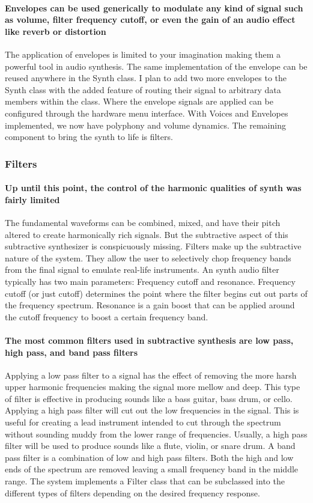 \documentclass[acmlarge,screen]{acmart}
\begin{document}
	
	\paragraph{Envelopes can be used generically to modulate any kind of signal such as volume, filter frequency cutoff, or even the gain of an audio effect like reverb or distortion} The application of envelopes is limited to your imagination making them a powerful tool in audio synthesis. The same implementation of the envelope can be reused anywhere in the Synth class. I plan to add two more envelopes to the Synth class with the added feature of routing their signal to arbitrary data members within the class. Where the envelope signals are applied can be configured through the hardware menu interface. With Voices and Envelopes implemented, we now have polyphony and volume dynamics. The remaining component to bring the synth to life is filters.

	\subsubsection{Filters}
	\paragraph{Up until this point, the control of the harmonic qualities of synth was fairly limited} The fundamental waveforms can be combined, mixed, and have their pitch altered to create harmonically rich signals. But the subtractive aspect of this subtractive synthesizer is conspicuously missing. Filters make up the subtractive nature of the system. They allow the user to selectively chop frequency bands from the final signal to emulate real-life instruments.\cite{welsh_2006} An synth audio filter typically has two main parameters: Frequency cutoff and resonance. Frequency cutoff (or just cutoff) determines the point where the filter begins cut out parts of the frequency spectrum. Resonance is a gain boost that can be applied around the cutoff frequency to boost a certain frequency band. \cite{musictech}
	
	\paragraph{The most common filters used in subtractive synthesis are low pass, high pass, and band pass filters} Applying a low pass filter to a signal has the effect of removing the more harsh upper harmonic frequencies making the signal more mellow and deep. This type of filter is effective in producing sounds like a bass guitar, bass drum, or cello. Applying a high pass filter will cut out the low frequencies in the signal. This is useful for creating a lead instrument intended to cut through the spectrum without sounding muddy from the lower range of frequencies. Usually, a high pass filter will be used to produce sounds like a flute, violin, or snare drum. A band pass filter is a combination of low and high pass filters. Both the high and low ends of the spectrum are removed leaving a small frequency band in the middle range. The system implements a Filter class that can be subclassed into the different types of filters depending on the desired frequency response. \cite{hass_2021} 
	
\end{document}
